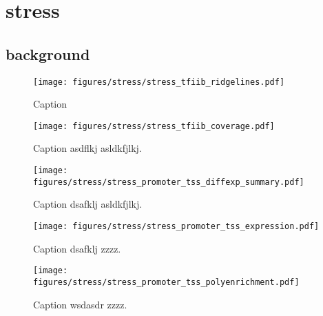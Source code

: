 \chapter{stress}

\section{background}

\lipsum

\begin{figure}
\texttt{[image: figures/stress/stress\_tfiib\_ridgelines.pdf]}
\caption{Caption}
\label{fig:stress_tfiib_ridgelines}
\end{figure}

\begin{figure}
\texttt{[image: figures/stress/stress\_tfiib\_coverage.pdf]}
\caption{Caption asdflkj asldkfjlkj.}
\label{fig:stress_tfiib_coverage}
\end{figure}

\begin{figure}
\texttt{[image: figures/stress/stress\_promoter\_tss\_diffexp\_summary.pdf]}
\caption{Caption dsafklj asldkfjlkj.}
\label{fig:stress_promoter_tss_diffexp_summary}
\end{figure}

\begin{figure}
\texttt{[image: figures/stress/stress\_promoter\_tss\_expression.pdf]}
\caption{Caption dsafklj zzzz.}
\label{fig:stress_promoter_tss_diffexp_summary}
\end{figure}

\begin{figure}
\texttt{[image: figures/stress/stress\_promoter\_tss\_polyenrichment.pdf]}
\caption{Caption wsdasdr zzzz.}
\label{fig:stress_promoter_tss_polyenrichment}
\end{figure}

\newpage

\begingroup
\singlespacing

\endgroup
